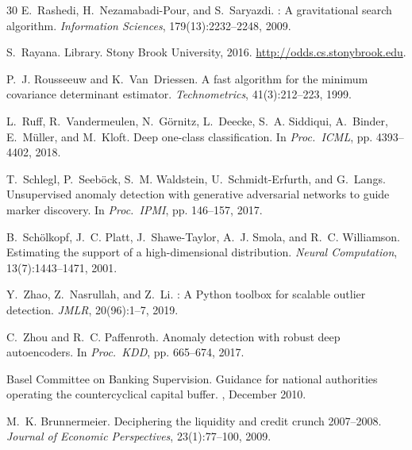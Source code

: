 \documentclass{article}
\begin{document}
\begin{thebibliography}{30}
E.~Rashedi, H.~Nezamabadi-Pour, and S.~Saryazdi.
: A gravitational search algorithm.
\newblock \emph{Information Sciences}, 179(13):2232--2248, 2009.

S.~Rayana.
 Library.
\newblock Stony Brook University, 2016.
\newblock \url{http://odds.cs.stonybrook.edu}.

P.~J. Rousseeuw and K.~Van~Driessen.
\newblock A fast algorithm for the minimum covariance determinant estimator.
\newblock \emph{Technometrics}, 41(3):212--223, 1999.

L.~Ruff, R.~Vandermeulen, N.~G\"{o}rnitz, L.~Deecke, S.~A. Siddiqui, A.~Binder, E.~M\"{u}ller, and M.~Kloft.
\newblock Deep one-class classification.
\newblock In \emph{Proc.\ ICML}, pp. 4393--4402, 2018.

T.~Schlegl, P.~Seeb\"{o}ck, S.~M. Waldstein, U.~Schmidt-Erfurth, and G.~Langs.
\newblock Unsupervised anomaly detection with generative adversarial networks to guide marker discovery.
\newblock In \emph{Proc.\ IPMI}, pp. 146--157, 2017.

B.~Sch\"{o}lkopf, J.~C. Platt, J.~Shawe-Taylor, A.~J. Smola, and R.~C. Williamson.
\newblock Estimating the support of a high-dimensional distribution.
\newblock \emph{Neural Computation}, 13(7):1443--1471, 2001.

Y.~Zhao, Z.~Nasrullah, and Z.~Li.
: A {P}ython toolbox for scalable outlier detection.
\newblock \emph{JMLR}, 20(96):1--7, 2019.

C.~Zhou and R.~C. Paffenroth.
\newblock Anomaly detection with robust deep autoencoders.
\newblock In \emph{Proc.\ KDD}, pp. 665--674, 2017.

{Basel Committee on Banking Supervision}.
\newblock Guidance for national authorities operating the countercyclical capital buffer.
, December 2010.

M.~K. Brunnermeier.
\newblock Deciphering the liquidity and credit crunch 2007--2008.
\newblock \emph{Journal of Economic Perspectives}, 23(1):77--100, 2009.


\end{thebibliography}
\end{document}

